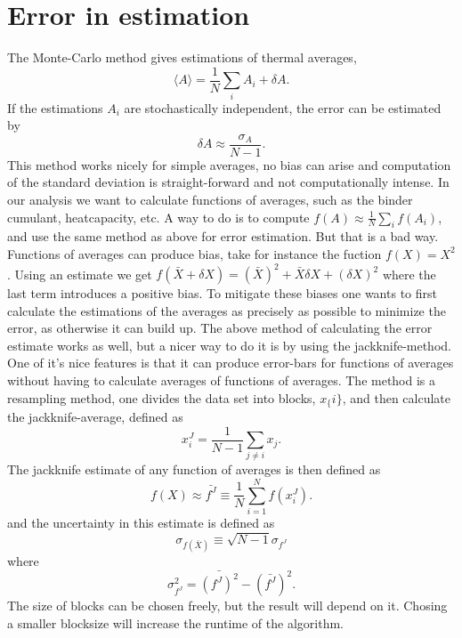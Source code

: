 \section{Error in estimation}
The Monte-Carlo method gives estimations of thermal averages,
\begin{equation}
  \langle A \rangle = \frac{1}{N}\sum_i A_i +\delta A.
  \label{}
\end{equation}
If the estimations $A_i$ are stochastically independent, the error can be estimated by
\begin{equation}
  \delta A \approx \frac{\sigma_A}{N-1}.
  \label{}
\end{equation}
This method works nicely for simple averages, no bias can arise and computation of the standard deviation is straight-forward and not computationally intense.
In our analysis we want to calculate functions of averages, such as the binder cumulant, heatcapacity, etc.
A way to do is to compute
$f(A) \approx \frac{1}{N}\sum_i f(A_i)$, and use the same method as above for error estimation.
But that is a bad way.
Functions of averages can produce bias, take for instance the fuction $f(X) = X^2$. Using an estimate  we get $ f(\bar{X} + \delta X) = (\bar{X})^2 + \bar{X}\delta X + (\delta X)^2$ where the last term introduces a positive bias.
To mitigate these biases one wants to first calculate the estimations of the averages as precisely as possible to minimize the error, as otherwise it can build up.
The above method of calculating the error estimate works as well, but a nicer way to do it is by using the jackknife-method.
One of it's nice features is that it can produce error-bars for functions of averages without having to calculate averages of functions of averages.
The method is a resampling method, one divides the data set into blocks, $x_\{i\}$, and then calculate the jackknife-average, defined as 
\begin{equation}
  x_i^J = \frac{1}{N-1}\sum_{j\neq i}x_j.
\end{equation}
The jackknife estimate of any function of averages is then defined as 
\begin{equation}
  f(X)\approx \bar{f^J}\equiv \frac{1}{N}\sum_{i=1}^{N} f(x_i^J).
  \label{}
\end{equation}
and the uncertainty in this estimate is defined as 
\begin{equation}
  \sigma_{f(\bar{X})} \equiv \sqrt{N-1}\sigma_{f^J}
\end{equation}
where
\begin{equation}
  \sigma^2_{f^J} = \bar{(f^J)^2} - (\bar{f^J})^2.
  \label{}
\end{equation}
The size of blocks can be chosen freely, but the result will depend on it. Chosing a smaller blocksize will increase the runtime of the algorithm.

